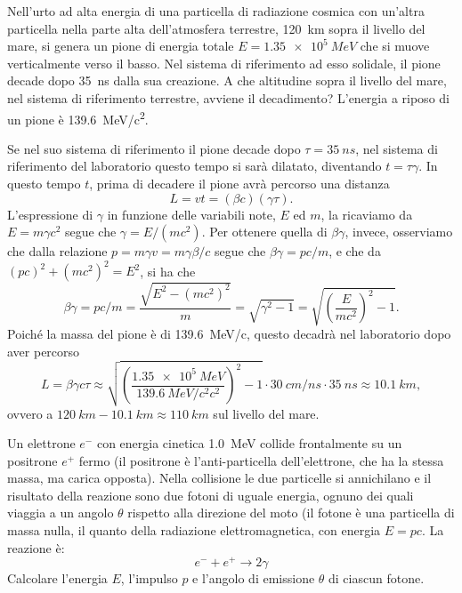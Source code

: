 \begin{Exercise}[title={Dilatazione dei tempi e quadrimpulso}]
Nell’urto ad alta energia di una particella di radiazione cosmica con
un’altra particella nella parte alta dell’atmosfera terrestre,
\SI{120}{km} sopra il livello del mare, si genera un pione di energia
totale $E=\SI{1.35e5}{MeV}$ che si muove verticalmente verso il
basso. Nel sistema di riferimento ad esso solidale, il pione decade
dopo \SI{35}{ns} dalla sua creazione. A che altitudine sopra il
livello del mare, nel sistema di riferimento terrestre, avviene il
decadimento? L’energia a riposo di un pione è \SI{139.6}{MeV/c^2}.
\end{Exercise}
\begin{Answer}
Se nel suo sistema di riferimento il pione decade dopo
$\tau=\SI{35}{ns}$, nel sistema di riferimento del laboratorio questo
tempo si sarà dilatato, diventando $t=\tau\gamma$. In questo tempo
$t$, prima di decadere il pione avrà percorso una distanza
\begin{equation*}
    L = v t = (\beta c) (\gamma \tau).
\end{equation*}
L'espressione di $\gamma$ in funzione delle variabili note, $E$ ed
$m$, la ricaviamo da $E=m\gamma c^2$ segue che $\gamma=E/(mc^2)$. Per
ottenere quella di $\beta\gamma$, invece, osserviamo che dalla
relazione $p=m\gamma v = m\gamma\beta/c$ segue che $\beta\gamma =
pc/m$, e che da $(pc)^2+(mc^2)^2=E^2$, si ha che
\begin{equation*}
    \beta\gamma = pc/m = \frac{\sqrt{E^2-(mc^2)^2}}{m} = \sqrt{\gamma^2-1} = \sqrt{\left(\frac{E}{mc^2}\right)^2-1}.
\end{equation*}
Poiché la massa del pione è di \SI{139.6}{MeV/c}, questo decadrà nel laboratorio dopo aver percorso
\begin{equation*}
    L = \beta\gamma c\tau \approx
    \sqrt{\left(\frac{\SI{1.35e5}{MeV}}{\SI{139.6}{MeV/c^2}c^2}\right)^2-1}\cdot\SI{30}{cm/ns}\cdot\SI{35}{ns}
    \approx \SI{ 10.1}{km},
\end{equation*}
ovvero a $\SI{120}{km}-\SI{10.1}{km}\approx\SI{110}{km}$ sul livello del mare.
\end{Answer}


\begin{Exercise}[title={Conservazione dell'energia e impulso}]
  Un elettrone $e^-$ con energia cinetica \SI{1.0}{MeV} collide
  frontalmente su un positrone $e^+$ fermo (il positrone \`e
  l'anti-particella dell'elettrone, che ha la stessa massa, ma carica
  opposta). Nella collisione le due particelle si annichilano e il
  risultato della reazione sono due fotoni di uguale energia, ognuno
  dei quali viaggia a un angolo $\theta$ rispetto alla direzione del
  moto (il fotone \`e una particella di massa nulla, il quanto della
  radiazione elettromagnetica, con energia $E=pc$. La reazione \`e:
  \begin{equation*}
    e^- + e^+ \rightarrow 2\gamma
  \end{equation*}
\Question Calcolare l'energia $E$, l'impulso $p$ e l'angolo di
emissione $\theta$ di ciascun fotone.
\end{Exercise}

